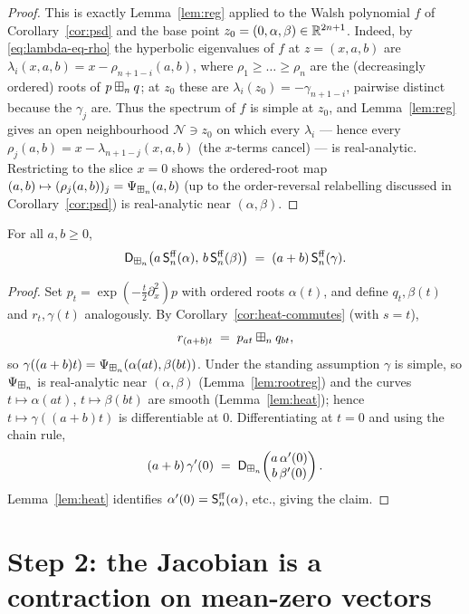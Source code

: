 \begin{proof}
This is exactly Lemma~\ref{lem:reg} applied to the Walsh polynomial $f$ of
Corollary~\ref{cor:psd} and the base point $z_0=(0,\alpha,\beta)\in\mathbb{R}^{2n+1}$.
Indeed, by \eqref{eq:lambda-eq-rho} the hyperbolic eigenvalues of $f$ at
$z=(x,a,b)$ are $\lambda_i(x,a,b)=x-\rho_{n+1-i}(a,b)$, where
$\rho_1\ge\dots\ge\rho_n$ are the (decreasingly ordered) roots of $p\boxplus_n q$;
at $z_0$ these are $\lambda_i(z_0)=-\gamma_{n+1-i}$, pairwise distinct because the
$\gamma_j$ are. Thus the spectrum of $f$ is simple at $z_0$, and
Lemma~\ref{lem:reg} gives an open neighbourhood $\mathcal N\ni z_0$ on which every
$\lambda_i$ — hence every $\rho_j(a,b)=x-\lambda_{n+1-j}(x,a,b)$ (the $x$-terms
cancel) — is real-analytic. Restricting to the slice $x=0$ shows the ordered-root
map $(a,b)\mapsto(\rho_j(a,b))_j=\Psi_{\boxplus_n}(a,b)$ (up to the order-reversal
relabelling discussed in Corollary~\ref{cor:psd}) is real-analytic near
$(\alpha,\beta)$.
\end{proof}


\begin{qfourobservation}\label{obs:scores}
For all $a,b\ge0$,
\[
\mathsf{D}_{\boxplus_n}\bigl(a\,\mathsf{S}^{\mathrm{ff}}_n(\alpha),\,b\,\mathsf{S}^{\mathrm{ff}}_n(\beta)\bigr)\;=\;(a+b)\,\mathsf{S}^{\mathrm{ff}}_n(\gamma).
\]
\end{qfourobservation}

\begin{proof}
Set $p_t=\exp(-\tfrac t2\partial_x^2)p$ with ordered roots $\alpha(t)$, and
define $q_t,\beta(t)$ and $r_t,\gamma(t)$ analogously.
By Corollary~\ref{cor:heat-commutes} (with $s=t$),
\[
r_{(a+b)t}\;=\;p_{at}\boxplus_n q_{bt},
\]
so $\gamma((a+b)t)=\Psi_{\boxplus_n}(\alpha(at),\beta(bt))$. Under the standing
assumption $\gamma$ is simple, so $\Psi_{\boxplus_n}$ is real-analytic near
$(\alpha,\beta)$ (Lemma~\ref{lem:rootreg}) and the curves $t\mapsto\alpha(at)$,
$t\mapsto\beta(bt)$ are smooth (Lemma~\ref{lem:heat}); hence $t\mapsto\gamma((a+b)t)$
is differentiable at $0$. Differentiating at
$t=0$ and using the chain rule,
\[
(a+b)\,\gamma'(0)\;=\;\mathsf{D}_{\boxplus_n}\!\begin{pmatrix} a\,\alpha'(0)\\ b\,\beta'(0)\end{pmatrix}.
\]
Lemma~\ref{lem:heat} identifies $\alpha'(0)=\mathsf{S}^{\mathrm{ff}}_n(\alpha)$, etc., giving the
claim.
\end{proof}

\section*{Step 2: the Jacobian is a contraction on mean-zero vectors}

